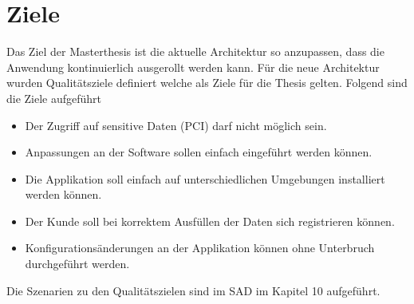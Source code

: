 \chapter{Ziele}

Das Ziel der Masterthesis ist die aktuelle Architektur so anzupassen, dass die Anwendung kontinuierlich ausgerollt werden kann. Für die neue Architektur wurden Qualitätsziele definiert welche als Ziele für die Thesis gelten. Folgend sind die Ziele aufgeführt

\begin{itemize}
	\item Der Zugriff auf sensitive Daten (PCI) darf nicht möglich sein.
	\item Anpassungen an der Software sollen einfach eingeführt werden können.
	\item Die Applikation soll einfach auf unterschiedlichen Umgebungen installiert werden können.
	\item Der Kunde soll bei korrektem Ausfüllen der Daten sich registrieren können.
	\item Konfigurationsänderungen an der Applikation können ohne Unterbruch durchgeführt werden.
\end{itemize}

Die Szenarien zu den Qualitätszielen sind im SAD im Kapitel 10 aufgeführt.
